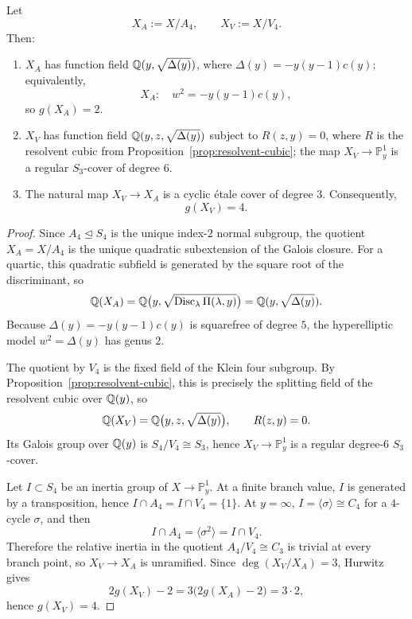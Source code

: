 \begin{proposition}\label{prop:normal-quotients}
Let
\[
X_A:=X/A_4,\qquad X_V:=X/V_4.
\]
Then:
\begin{enumerate}
\item[(i)] \(X_A\) has function field \(\mathbb{Q}(y,\sqrt{\Delta(y)})\), where \(\Delta(y)=-y(y-1)c(y)\); equivalently,
\[
X_A:\quad w^2=-y(y-1)c(y),
\]
so \(g(X_A)=2\).
\item[(ii)] \(X_V\) has function field \(\mathbb{Q}(y,z,\sqrt{\Delta(y)})\) subject to \(R(z,y)=0\), where \(R\) is the resolvent cubic from Proposition~\ref{prop:resolvent-cubic}; the map \(X_V\to\mathbb{P}^1_y\) is a regular \(S_3\)-cover of degree \(6\).
\item[(iii)] The natural map \(X_V\to X_A\) is a cyclic étale cover of degree \(3\). Consequently,
\[
g(X_V)=4.
\]
\end{enumerate}
\end{proposition}

\begin{proof}
Since \(A_4\trianglelefteq S_4\) is the unique index-\(2\) normal subgroup, the quotient \(X_A=X/A_4\) is the unique quadratic subextension of the Galois closure.
For a quartic, this quadratic subfield is generated by the square root of the discriminant, so
\[
\mathbb{Q}(X_A)=\mathbb{Q}\bigl(y,\sqrt{\operatorname{Disc}_\lambda\Pi(\lambda,y)}\bigr)=\mathbb{Q}(y,\sqrt{\Delta(y)}).
\]
Because \(\Delta(y)=-y(y-1)c(y)\) is squarefree of degree \(5\), the hyperelliptic model \(w^2=\Delta(y)\) has genus \(2\).

The quotient by \(V_4\) is the fixed field of the Klein four subgroup.
By Proposition~\ref{prop:resolvent-cubic}, this is precisely the splitting field of the resolvent cubic over \(\mathbb{Q}(y)\), so
\[
\mathbb{Q}(X_V)=\mathbb{Q}\bigl(y,z,\sqrt{\Delta(y)}\bigr),\qquad R(z,y)=0.
\]
Its Galois group over \(\mathbb{Q}(y)\) is \(S_4/V_4\cong S_3\), hence \(X_V\to\mathbb{P}^1_y\) is a regular degree-\(6\) \(S_3\)-cover.

Let \(I\subset S_4\) be an inertia group of \(X\to\mathbb{P}^1_y\).
At a finite branch value, \(I\) is generated by a transposition, hence \(I\cap A_4=I\cap V_4=\{1\}\).
At \(y=\infty\), \(I=\langle\sigma\rangle\cong C_4\) for a \(4\)-cycle \(\sigma\), and then
\[
I\cap A_4=\langle\sigma^2\rangle=I\cap V_4.
\]
Therefore the relative inertia in the quotient \(A_4/V_4\cong C_3\) is trivial at every branch point, so \(X_V\to X_A\) is unramified.
Since \(\deg(X_V/X_A)=3\), Hurwitz gives
\[
2g(X_V)-2=3\bigl(2g(X_A)-2\bigr)=3\cdot 2,
\]
hence \(g(X_V)=4\).
\end{proof}


